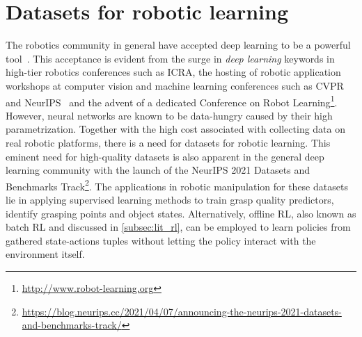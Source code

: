 \documentclass[\home/main.tex]{subfiles}
\begin{document}
\section{Datasets for robotic learning} \label{sec:lit_datasets}
The robotics community in general have accepted deep learning to be a powerful tool~\autocite{Sunderhauf2018}. This acceptance is evident from the surge in \textit{deep learning} keywords in high-tier robotics conferences such as ICRA, the hosting of robotic application workshops at computer vision and machine learning conferences such as CVPR~\autocite{angelova2017computer} and NeurIPS~\autocite{Posner2017} and the advent of a dedicated Conference on Robot Learning\footnote{\url{http://www.robot-learning.org}}. However, neural networks are known to be data-hungry caused by their high parametrization. Together with the high cost associated with collecting data on real robotic platforms, there is a need for datasets for robotic learning. This eminent need for high-quality datasets is also apparent in the general deep learning community with the launch of the NeurIPS 2021 Datasets and Benchmarks Track\footnote{\url{https://blog.neurips.cc/2021/04/07/announcing-the-neurips-2021-datasets-and-benchmarks-track/}}. The applications in robotic manipulation for these datasets lie in applying supervised learning methods to train grasp quality predictors, identify grasping points and object states. Alternatively, offline RL, also known as batch RL and discussed in \cref{subsec:lit_rl}, can be employed to learn policies from gathered state-actions tuples without letting the policy interact with the environment itself.
\end{document}
